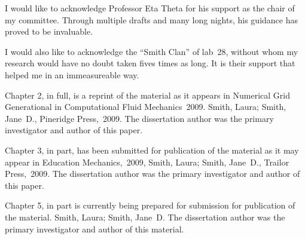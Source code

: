 \begin{acknowledgements}
    I would like to acknowledge Professor Eta Theta for his support as the
    chair of my committee. Through multiple drafts and many long nights,
    his guidance has proved to be invaluable.
    
    I would also like to acknowledge the ``Smith Clan'' of lab~28, without
    whom my research would have no doubt taken fives times as long. It is
    their support that helped me in an immeasureable way.
    
    Chapter 2, in full, is a reprint of the material as it appears in
    Numerical Grid Generational in Computational Fluid Mechanics~2009.
    Smith, Laura; Smith, Jane~D., Pineridge Press,~2009. The dissertation
    author was the primary investigator and author of this paper.
    
    Chapter 3, in part, has been submitted for publication of the material
    as it may appear in Education Mechanics,~2009, Smith, Laura; Smith,
    Jane~D., Trailor Press,~2009. The dissertation author was the primary
    investigator and author of this paper.
    
    Chapter 5, in part is currently being prepared for submission for
    publication of the material. Smith, Laura; Smith, Jane~D\@. The
    dissertation author was the primary investigator and author of this
    material.
\end{acknowledgements}